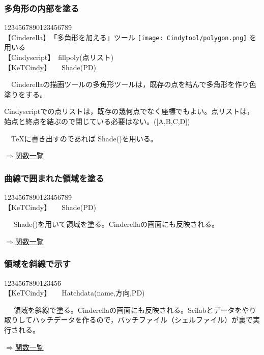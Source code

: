 \documentclass[papersize,a4paper,12pt,uplatex]{jsarticle}
\begin{document}
\subsubsection{多角形の内部を塗る}

\begin{tabbing}
12\=34567890123456789\=\kill\\

\>【Cinderella】　\>「多角形を加える」ツール \texttt{[image: Cindytool/polygon.png]} を用いる　\\ 
\>【Cindyscript】　\>fillpoly(点リスト)\\
 \>【KeTCindy】　　\>Shade(PD)\\
\end{tabbing}
　Cinderellaの描画ツールの多角形ツールは，既存の点を結んで多角形を作り色塗りをする。

Cindyscriptでの点リストは，既存の幾何点でなく座標でもよい。点リストは，始点と終点を結ぶので閉じている必要はない。([A,B,C,D])

　TeXに書き出すのであれば Shade()を用いる。\\
\begin{flushright} \hyperlink{functionlist3d}{$\Rightarrow$関数一覧}\end{flushright}


\subsubsection{曲線で囲まれた領域を塗る}
\begin{tabbing}
12\=34567890123456789\=\kill\\

 \>【KeTCindy】　　\>Shade(PD)\\
\end{tabbing}
　 Shade()を用いて領域を塗る。Cinderellaの画面にも反映される。\\
\begin{flushright} \hyperlink{functionlist3d}{$\Rightarrow$関数一覧}\end{flushright}


\subsubsection{領域を斜線で示す}

\begin{tabbing}
12\=34567890123456\=\kill\\
 \>【KeTCindy】　　\>Hatchdata(name,方向,PD)\\
\end{tabbing}
　 領域を斜線で塗る。Cinderellaの画面にも反映される。Scilabとデータをやり取りしてハッチデータを作るので，バッチファイル（シェルファイル）が裏で実行される。\\\begin{flushright} \hyperlink{functionlist3d}{$\Rightarrow$関数一覧}\end{flushright}
\end{document}
